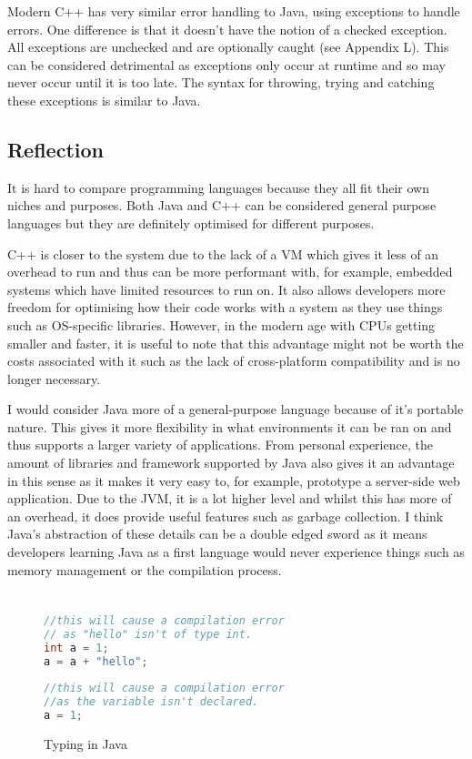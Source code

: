 \documentclass[]{report}
\begin{document}
Modern C++ has very similar error handling to Java, using exceptions to handle errors. One difference is that it doesn't have the notion of a checked exception. All exceptions are unchecked and are optionally caught (see Appendix L). This can be considered detrimental as exceptions only occur at runtime and so may never occur until it is too late. The syntax for throwing, trying and catching these exceptions is similar to Java.\cite{ExceptionsC++}

\section{Reflection}

It is hard to compare programming languages because they all fit their own niches and purposes. Both Java and C++ can be considered general purpose languages but they are definitely optimised for different purposes. 

C++ is closer to the system due to the lack of a VM which gives it less of an overhead to run and thus can be more performant with, for example, embedded systems which have limited resources to run on. It also allows developers more freedom for optimising how their code works with a system as they use things such as OS-specific libraries. However, in the modern age with CPUs getting smaller and faster, it is useful to note that this advantage might not be worth the costs associated with it such as the lack of cross-platform compatibility and is no longer necessary.

I would consider Java more of a general-purpose language because of it's portable nature. This gives it more flexibility in what environments it can be ran on and thus supports a larger variety of applications. From personal experience, the amount of libraries and framework supported by Java also gives it an advantage in this sense as it makes it very easy to, for example, prototype a server-side web application. Due to the JVM, it is a lot higher level and whilst this has more of an overhead, it does provide useful features such as garbage collection. I think Java's abstraction of these details can be a double edged sword as it means developers learning Java as a first language would never experience things such as memory management or the compilation process.

\appendix
\chapter{}
\begin{figure}[h!]
	\caption{Typing in Java}
	\begin{lstlisting}[language=Java,frame=single]
//this will cause a compilation error
// as "hello" isn't of type int.
int a = 1;
a = a + "hello";
	\end{lstlisting}
	\begin{lstlisting}[language=Java,frame=single]
//this will cause a compilation error
//as the variable isn't declared.
a = 1;
	\end{lstlisting}
\end{figure}
\end{document}

